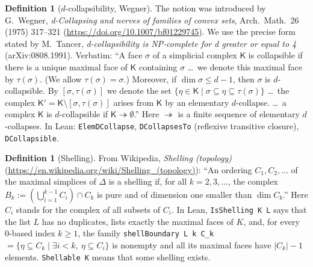 \documentclass[11pt]{article}
\theoremstyle{definition}
\newtheorem{definition}[theorem]{Definition}
\begin{document}
\begin{definition}[$d$-collapsibility, Wegner]
The notion was introduced by G.~Wegner, \emph{d-Collapsing and nerves of families of convex sets},
Arch.\ Math.\ 26 (1975) 317--321 (\url{https://doi.org/10.1007/bf01229745}). We use the precise form
stated by M.~Tancer, \emph{d-collapsibility is NP-complete for d greater or equal to 4}
(arXiv:0808.1991). Verbatim: ``A face $\sigma$ of a simplicial complex $\mathsf{K}$ is collapsible if
there is a unique maximal face of $\mathsf{K}$ containing $\sigma$ \ldots\ we denote this maximal
face by $\tau(\sigma)$. (We allow $\tau(\sigma)=\sigma$.) Moreover, if $\dim\sigma\leq d-1$, then
$\sigma$ is $d$-collapsible. By $[\sigma,\tau(\sigma)]$ we denote the set
$\{\eta\in\mathsf{K} \mid \sigma\subseteq\eta\subseteq\tau(\sigma)\}$ \ldots\ the complex
$\mathsf{K}'=\mathsf{K}\setminus[\sigma,\tau(\sigma)]$ arises from $\mathsf{K}$ by an elementary
$d$-collapse. \ldots\ a complex $\mathsf{K}$ is $d$-collapsible if
$\mathsf{K}\twoheadrightarrow\emptyset$.'' Here $\twoheadrightarrow$ is a finite sequence of
elementary $d$-collapses. In Lean: \texttt{ElemDCollapse}, \texttt{DCollapsesTo} (reflexive
transitive closure), \texttt{DCollapsible}.
\end{definition}

\begin{definition}[Shelling]
From Wikipedia, \emph{Shelling (topology)}
(\url{https://en.wikipedia.org/wiki/Shelling_(topology)}): ``An ordering $C_1,C_2,\ldots$ of the
maximal simplices of $\Delta$ is a shelling if, for all $k=2,3,\ldots$, the complex
$B_k:=(\bigcup_{i=1}^{k-1}C_i)\cap C_k$ is pure and of dimension one smaller than $\dim C_k$.''
Here $C_i$ stands for the complex of all subsets of $C_i$. In Lean, \texttt{IsShelling K L} says
that the list $L$ has no duplicates, lists exactly the maximal faces of $K$, and, for every
0-based index $k\ge 1$, the family \texttt{shellBoundary L k C\_k} $=\{\eta\subseteq C_k \mid
\exists i<k,\ \eta\subseteq C_i\}$ is nonempty and all its maximal faces have $|C_k|-1$ elements.
\texttt{Shellable K} means that some shelling exists.
\end{definition}
\end{document}
